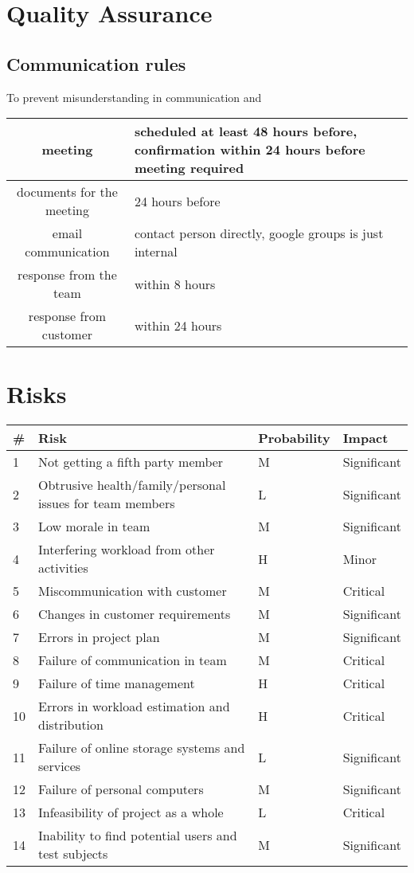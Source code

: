 \section{Quality Assurance}
\subsection{Communication rules}
To prevent misunderstanding in communication and

\begin{tabularx}{\textwidth}{ | c | X | }
  \hline
  meeting & scheduled at least 48 hours before, confirmation within 24 hours before meeting required \\ \hline
  documents for the meeting & 24 hours before \\ \hline
  email communication & contact person directly, google groups is just internal \\ \hline
  response from the team & within 8 hours \\ \hline
  response from customer & within 24 hours \\ \hline
\end{tabularx}

\section{Risks}
\begin{tabularx}{\textwidth}{ | l | X | l | l | }
  \hline
  \textbf{\#} & \textbf{Risk} & \textbf{Probability} & \textbf{Impact} \\ \hline
  1 & Not getting a fifth party member & M & Significant \\ \hline
  2 & Obtrusive health/family/personal issues for team members & L & Significant \\ \hline
  3 & Low morale in team & M & Significant \\ \hline
  4 & Interfering workload from other activities & H & Minor \\ \hline
  5 & Miscommunication with customer & M & Critical \\ \hline
  6 & Changes in customer requirements & M & Significant \\ \hline
  7 & Errors in project plan & M & Significant \\ \hline
  8 & Failure of communication in team & M & Critical \\ \hline
  9 & Failure of time management & H & Critical \\ \hline
 10 & Errors in workload estimation and distribution & H & Critical \\ \hline
 11 & Failure of online storage systems and services & L & Significant \\ \hline
 12 & Failure of personal computers & M & Significant \\ \hline
 13 & Infeasibility of project as a whole & L & Critical \\ \hline
 14 & Inability to find potential users and test subjects & M & Significant \\ \hline
\end{tabularx}



